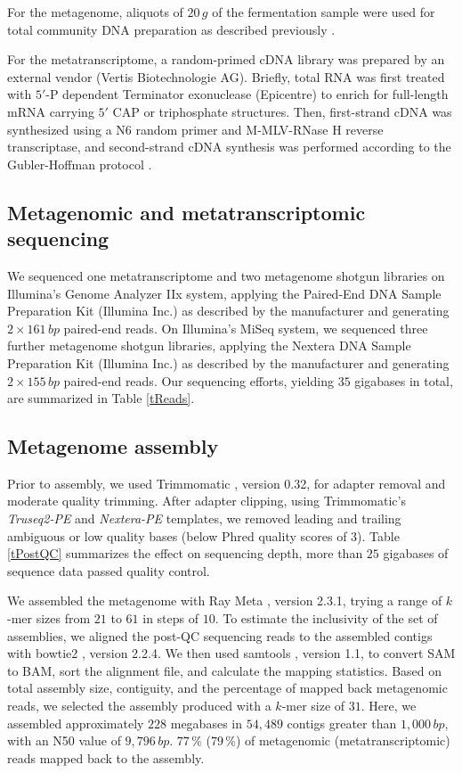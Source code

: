 \documentclass{bmcart}
\begin{document}
For the metagenome, aliquots of $20\,g$ of the fermentation sample were used for total community DNA preparation as described previously \cite{Schlueter2008}.

For the metatranscriptome, a random-primed cDNA library was prepared by an external vendor (Vertis Biotechnologie AG). Briefly, total RNA was first treated with $5'$-P dependent Terminator exonuclease (Epicentre) to enrich for full-length mRNA carrying $5'$ CAP or triphosphate structures. Then, first-strand cDNA was synthesized using a N6 random primer and M-MLV-RNase H reverse transcriptase, and second-strand cDNA synthesis was performed according to the Gubler-Hoffman protocol \cite{GublerHoffman}.

\subsection*{Metagenomic and metatranscriptomic sequencing}
We sequenced one metatranscriptome and two metagenome shotgun libraries on Illumina's Genome Analyzer IIx system, applying the Paired-End DNA Sample Preparation Kit (Illumina Inc.) as described by the manufacturer and generating $2 \times 161\,bp$ paired-end reads.
On Illumina's MiSeq system, we sequenced three further metagenome shotgun libraries, applying the Nextera DNA Sample Preparation Kit (Illumina Inc.) as described by the manufacturer and generating $2 \times 155\,bp$ paired-end reads.
Our sequencing efforts, yielding $35$ gigabases in total, are summarized in Table \ref{tReads}.

\subsection*{Metagenome assembly}
Prior to assembly, we used Trimmomatic \cite{Trimmomatic}, version 0.32, for adapter removal and moderate quality trimming.
After adapter clipping, using Trimmomatic's \emph{Truseq2-PE} and \emph{Nextera-PE} templates, we removed leading and trailing ambiguous or low quality bases (below Phred quality scores of 3).
Table \ref{tPostQC} summarizes the effect on sequencing depth, more than $25$ gigabases of sequence data passed quality control.

We assembled the metagenome with Ray Meta \cite{RayMeta}, version 2.3.1, trying a range of $k$-mer sizes from $21$ to $61$ in steps of $10$.
To estimate the inclusivity of the set of assemblies, we aligned the post-QC sequencing reads to the assembled contigs with bowtie2 \cite{Bowtie2}, version 2.2.4.
We then used samtools \cite{Samtools}, version 1.1, to convert SAM to BAM, sort the alignment file, and calculate the mapping statistics.
Based on total assembly size, contiguity, and the percentage of mapped back metagenomic reads, we selected the assembly produced with a $k$-mer size of $31$.
Here, we assembled approximately $228$ megabases in $54,489$ contigs greater than $1,000\,bp$, with an N50 value of $9,796\,bp$. %
$77\,\%$ ($79\,\%$) of metagenomic (metatranscriptomic) reads mapped back to the assembly.
\end{document}
